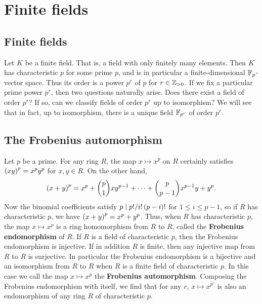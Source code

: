 \pagebreak

\section{Finite fields}

\subsection{Finite fields}


Let $ K $ be a finite field. That is, a field with only finitely many elements. Then $ K $ has characteristic $ p $ for some prime $ p $, and is in particular a finite-dimensional $ \mathbb{F}_p $-vector space. Thus its order is a power $ p^r $ of $ p $ for $ r \in \mathbb{Z}_{> 0} $. If we fix a particular prime power $ p^r $, then two questions naturally arise. Does there exist a field of order $ p^r $? If so, can we classify fields of order $ p^r $ up to isomorphism? We will see that in fact, up to isomorphism, there is a unique field $ \mathbb{F}_{p^r} $ of order $ p^r $.

\subsection{The Frobenius automorphism}

Let $ p $ be a prime. For any ring $ R $, the map $ x \mapsto x^p $ on $ R $ certainly satisfies $ \br{xy}^p = x^py^p $ for $ x, y \in R $. On the other hand,
$$ \br{x + y}^p = x^p + \binom{p}{1}xy^{p - 1} + \dots + \binom{p}{p - 1}x^{p - 1}y + y^p. $$
Now the binomial coefficients satisfy $ p \mid p! / i!\br{p - i}! $ for $ 1 \le i \le p - 1 $, so if $ R $ has characteristic $ p $, we have $ \br{x + y}^p = x^p + y^p $. Thus, when $ R $ has characteristic $ p $, the map $ x \mapsto x^p $ is a ring homomorphism from $ R $ to $ R $, called the \textbf{Frobenius endomorphism} of $ R $. If $ R $ is a field of characteristic $ p $, then the Frobenius endomorphism is injective. If in addition $ R $ is finite, then any injective map from $ R $ to $ R $ is surjective. In particular the Frobenius endomorphism is a bijective and an isomorphism from $ R $ to $ R $ when $ R $ is a finite field of characteristic $ p $. In this case we call the map $ x \mapsto x^p $ the \textbf{Frobenius automorphism}. Composing the Frobenius endomorphism with itself, we find that for any $ r $, $ x \mapsto x^{p^r} $ is also an endomorphism of any ring $ R $ of characteristic $ p $.

